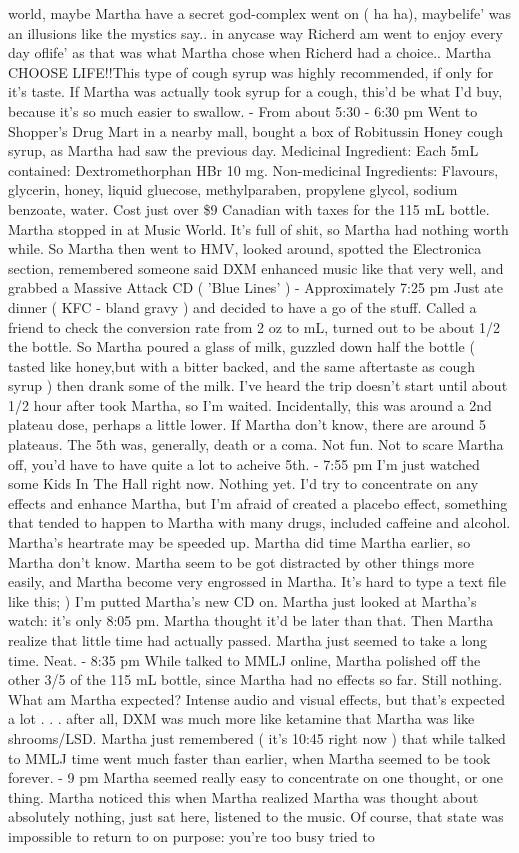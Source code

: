 \documentclass[12pt]{book}
\begin{document}
world, maybe Martha have a secret god-complex went on ( ha ha), maybelife' was an illusions like the mystics say.. in anycase way Richerd am went to enjoy every day oflife' as that was what Martha chose when Richerd had a choice.. Martha CHOOSE LIFE!!This type of cough syrup was highly recommended, if only for it's taste. If Martha was actually took syrup for a cough, this'd be what I'd buy, because it's so much easier to swallow. - From about 5:30 - 6:30 pm Went to Shopper's Drug Mart in a nearby mall, bought a box of Robitussin Honey cough syrup, as Martha had saw the previous day. Medicinal Ingredient: Each 5mL contained: Dextromethorphan HBr 10 mg. Non-medicinal Ingredients: Flavours, glycerin, honey, liquid gluecose, methylparaben, propylene glycol, sodium benzoate, water. Cost just over \$9 Canadian with taxes for the 115 mL bottle. Martha stopped in at Music World. It's full of shit, so Martha had nothing worth while. So Martha then went to HMV, looked around, spotted the Electronica section, remembered someone said DXM enhanced music like that very well, and grabbed a Massive Attack CD ( 'Blue Lines' ) - Approximately 7:25 pm Just ate dinner ( KFC - bland gravy ) and decided to have a go of the stuff. Called a friend to check the conversion rate from 2 oz to mL, turned out to be about 1/2 the bottle. So Martha poured a glass of milk, guzzled down half the bottle ( tasted like honey,but with a bitter backed, and the same aftertaste as cough syrup ) then drank some of the milk. I've heard the trip doesn't start until about 1/2 hour after took Martha, so I'm waited. Incidentally, this was around a 2nd plateau dose, perhaps a little lower. If Martha don't know, there are around 5 plateaus. The 5th was, generally, death or a coma. Not fun. Not to scare Martha off, you'd have to have quite a lot to acheive 5th. - 7:55 pm I'm just watched some Kids In The Hall right now. Nothing yet. I'd try to concentrate on any effects and enhance Martha, but I'm afraid of created a placebo effect, something that tended to happen to Martha with many drugs, included caffeine and alcohol. Martha's heartrate may be speeded up. Martha did time Martha earlier, so Martha don't know. Martha seem to be got distracted by other things more easily, and Martha become very engrossed in Martha. It's hard to type a text file like this; ) I'm putted Martha's new CD on. Martha just looked at Martha's watch: it's only 8:05 pm. Martha thought it'd be later than that. Then Martha realize that little time had actually passed. Martha just seemed to take a long time. Neat. - 8:35 pm While talked to MMLJ online, Martha polished off the other 3/5 of the 115 mL bottle, since Martha had no effects so far. Still nothing. What am Martha expected? Intense audio and visual effects, but that's expected a lot . . .  after all, DXM was much more like ketamine that Martha was like shrooms/LSD. Martha just remembered ( it's 10:45 right now ) that while talked to MMLJ time went much faster than earlier, when Martha seemed to be took forever. - 9 pm Martha seemed really easy to concentrate on one thought, or one thing. Martha noticed this when Martha realized Martha was thought about absolutely nothing, just sat here, listened to the music. Of course, that state was impossible to return to on purpose: you're too busy tried to 
\end{document}
